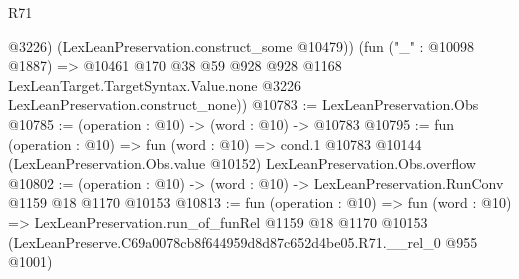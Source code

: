 \begin{lexlean}{R71}
\begin{coremodule}
          @3226)
        (LexLeanPreservation.construct_some @10479))
      (fun ("_" : @10098 @1887) =>
      @10461
        @170
        @38
        @59
        @928
        @928
        @1168
        LexLeanTarget.TargetSyntax.Value.none
        @3226
        LexLeanPreservation.construct_none))
@10783 := LexLeanPreservation.Obs
@10785 := (operation : @10) -> (word : @10) -> @10783
@10795 := fun (operation : @10) =>
  fun (word : @10) =>
  cond.{1} @10783 @10144 (LexLeanPreservation.Obs.value @10152) LexLeanPreservation.Obs.overflow
@10802 := (operation : @10) -> (word : @10) -> LexLeanPreservation.RunConv @1159 @18 @1170 @10153
@10813 := fun (operation : @10) =>
  fun (word : @10) =>
  LexLeanPreservation.run_of_funRel
    @1159
    @18
    @1170
    @10153
    (LexLeanPreserve.C69a0078cb8f644959d8d87c652d4be05.R71.__rel_0 @955 @1001)
\end{coremodule}
\end{lexlean}
